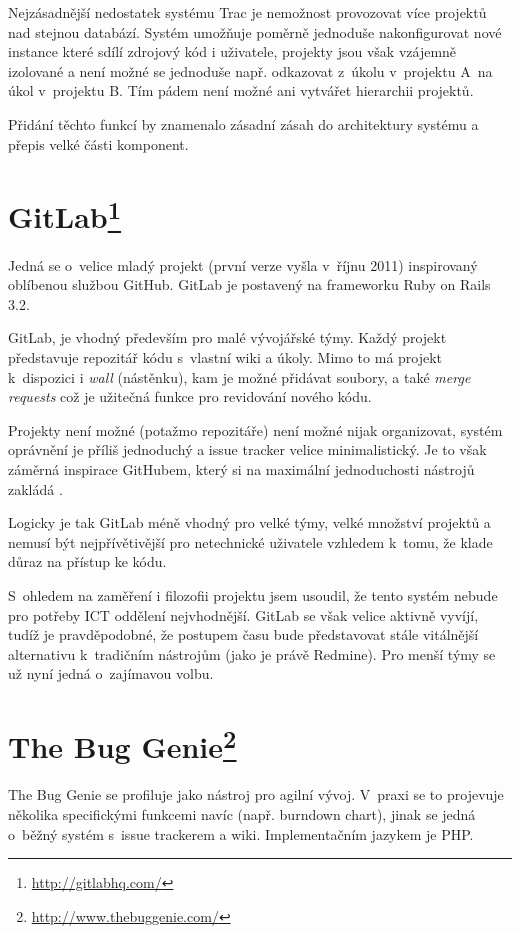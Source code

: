 \documentclass[thesis=B,czech]{FITthesis}[2012/05/02]
\begin{document}
Nejzásadnější nedostatek systému Trac je nemožnost provozovat více
projektů nad stejnou databází. Systém umožňuje poměrně jednoduše
nakonfigurovat nové instance které sdílí zdrojový kód i uživatele,
projekty jsou však vzájemně izolované a není možné se jednoduše např.
odkazovat z~úkolu v~projektu A~na úkol v~projektu B. Tím pádem není
možné ani vytvářet hierarchii projektů.

Přidání těchto funkcí by znamenalo zásadní zásah do architektury systému
a přepis velké části komponent.

\section[GitLab]{GitLab\footnote{\url{http://gitlabhq.com/}}}

Jedná se o~velice mladý projekt (první verze vyšla v~říjnu 2011)
inspirovaný oblíbenou službou GitHub. GitLab je postavený na frameworku
Ruby on Rails 3.2.

GitLab, je vhodný především pro malé vývojářské týmy. Každý projekt
představuje repozitář kódu s~vlastní wiki a úkoly. Mimo to má projekt
k~dispozici i \emph{wall} (nástěnku), kam je možné přidávat soubory, a také
\emph{merge requests} což je užitečná funkce pro revidování nového kódu.

Projekty není možné (potažmo repozitáře) není možné nijak organizovat,
systém oprávnění je příliš jednoduchý a issue tracker velice
minimalistický. Je to však záměrná inspirace GitHubem, který si na
maximální jednoduchosti nástrojů zakládá \citep[snímky
55-71]{Holman2011}.

Logicky je tak GitLab méně vhodný pro velké týmy, velké množství
projektů a nemusí být nejpřívětivější pro netechnické uživatele vzhledem
k~tomu, že klade důraz na přístup ke kódu.

S~ohledem na zaměření i filozofii projektu jsem usoudil, že tento systém
nebude pro potřeby ICT oddělení nejvhodnější. GitLab se však velice
aktivně vyvíjí, tudíž je pravděpodobné, že postupem času bude
představovat stále vitálnější alternativu k~tradičním nástrojům (jako je
právě Redmine). Pro menší týmy se už nyní jedná o~zajímavou volbu.

\section[The Bug Genie]{The Bug Genie\footnote{\url{http://www.thebuggenie.com/}}}

The Bug Genie se profiluje jako nástroj pro agilní vývoj. V~praxi se to
projevuje několika specifickými funkcemi navíc (např. burndown chart),
jinak se jedná o~běžný systém s~issue trackerem a wiki. Implementačním
jazykem je PHP.
\end{document}
